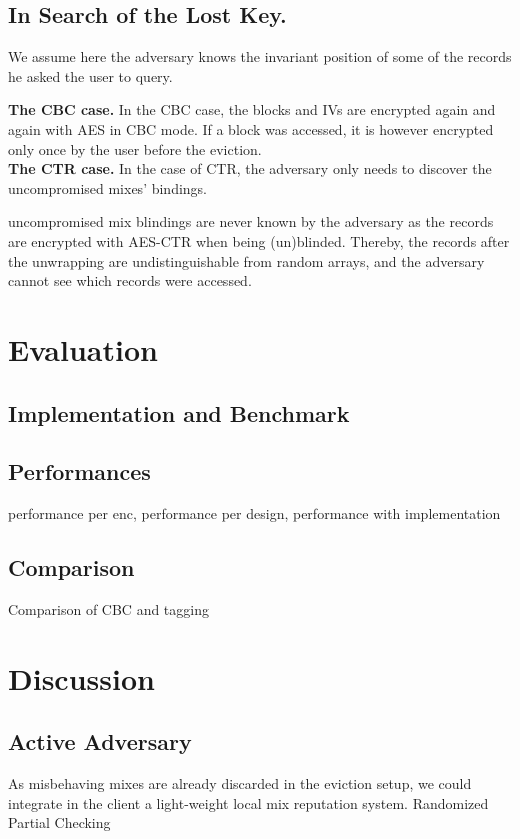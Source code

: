 \documentclass{llncs}
\begin{document}
\subsection{In Search of the Lost Key.}
We assume here the adversary knows the invariant position of some of the records he asked the user to query. 

\noindent\textbf{The CBC case.}
In the CBC case, the blocks and IVs are encrypted again and again with AES in CBC mode. If a block was accessed, it is however encrypted only once by the user before the eviction.\\

\noindent\textbf{The CTR case.}
In the case of CTR, the adversary only needs to discover the uncompromised mixes' bindings. 

uncompromised mix blindings are never known by the adversary as the records are encrypted with AES-CTR when being (un)blinded. Thereby, the records after the unwrapping are undistinguishable from random arrays, and the adversary cannot see which records were accessed.

\section{Evaluation}\label{Evaluation}
\subsection{Implementation and Benchmark}\label{Implementation}
\subsection{Performances}\label{Performance}
performance per enc, performance per design, performance with implementation
\subsection{Comparison}\label{Comparison}
Comparison of CBC and tagging


\section{Discussion}\label{Discussion}

\subsection{Active Adversary}\label{Active Adversary}
As misbehaving mixes are already discarded in the eviction setup, we could integrate in the client a light-weight local mix reputation system.
Randomized Partial Checking
\end{document}
